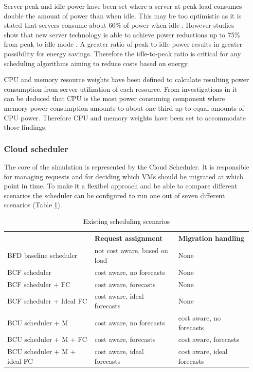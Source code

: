 Server peak and idle power have been set where a server at peak load consumes double the amount of power than when idle. This may be too optimistic as it is stated that servers consume about 60\% of power when idle \cite{meisner2009powernap}. However studies show that new server technology is able to achieve power reductions up to 75\% from peak to idle mode \cite{prime2011energy}. 
A greater ratio of peak to idle power results in greater possibility for energy savings. Therefore the idle-to-peak ratio is critical for any scheduling algorithms aiming to reduce costs based on energy. 

CPU and memory resource weights have been defined to calculate resulting power consumption from server utilization of each resource. From investigations in \cite{meisner2009powernap,kansal2010virtual} it can be deduced that CPU is the most power consuming component where memory power consumption amounts to about one third up to equal amounts of CPU power. Therefore CPU and memory weights have been set to accommodate those findings. 



\subsubsection{Cloud scheduler} \label{sec:cloud_scheduler}

The core of the simulation is represented by the Cloud Scheduler. It is responsible for managing requests and for deciding which VMs should be migrated at which point in time. To make it a flexibel approach and be able to compare different scenarios the scheduler can be configured to run one out of seven different scenarios (Table \ref{tab:existing_scheduling_scenarios}). 


\begin{table}[htbp]
\centering
\begin{tabular}{lll}
\hline
  & \textbf{Request assignment} & \textbf{Migration handling} \\
\hline
	BFD baseline scheduler &  not cost aware, based on load & None \\
	BCF scheduler & cost aware, no forecasts & None \\
	BCF scheduler + FC & cost aware, forecasts & None \\
	BCF scheduler + Ideal FC & cost aware, ideal forecasts & None \\
	BCU scheduler + M & cost aware, no forecasts & cost aware, no forecasts \\
	BCU scheduler + M + FC & cost aware, forecasts & cost aware, forecasts \\
	BCU scheduler + M + ideal FC & cost aware, ideal forecasts & cost aware, ideal forecasts \\
\hline
\end{tabular}
\caption{Existing scheduling scenarios}
\label{tab:existing_scheduling_scenarios}
\end{table}

